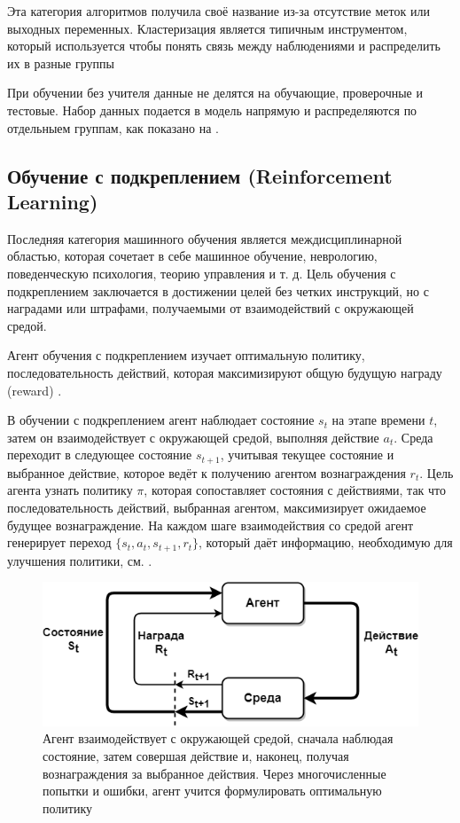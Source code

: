 Эта категория алгоритмов получила своё название из-за отсутствие меток или выходных переменных. Кластеризация является типичным инструментом, который используется чтобы понять связь между наблюдениями и распределить их в разные группы \cite{hastie2001elements}

При обучении без учителя данные не делятся на обучающие, проверочные и тестовые. Набор данных подается в модель напрямую и распределяются по отдельныем группам, как показано на .


\subsection{Обучение с подкреплением (Reinforcement Learning)}

Последняя категория машинного обучения является междисциплинарной областью, которая сочетает в себе машинное обучение, неврологию, поведенческую психология, теорию управления и т. д. Цель обучения с подкреплением заключается в достижении целей без четких инструкций, но с наградами или штрафами, получаемыми от взаимодействий с окружающей средой. 

Агент обучения с подкреплением изучает оптимальную политику, последовательность действий, которая максимизируют общую будущую награду (reward) \cite{SuttonAndBarto-RL-Introduction-p2}.

В обучении с подкреплением агент наблюдает состояние ${s_t}$ на этапе времени ${t}$, затем он взаимодействует с окружающей средой, выполняя действие ${a_t}$. Среда переходит в следующее состояние ${s_{t+1}}$, учитывая текущее состояние и выбранное действие, которое ведёт к получению агентом вознаграждения ${r_t}$. Цель агента узнать политику $\pi$, которая сопоставляет состояния с действиями, так что последовательность действий, выбранная агентом, максимизирует ожидаемое будущее вознаграждение. На каждом шаге взаимодействия со средой агент генерирует переход ${\{s_t, a_t, s_{t+1}, r_t\}}$, который даёт информацию, необходимую для улучшения политики, см. .

\begin{figure}[ht!] 
	\center
	\includegraphics [scale=0.60] {my_folder/images/ch1/rl-flow.png}
	\caption{Агент взаимодействует с окружающей средой, сначала наблюдая состояние, затем совершая действие и, наконец, получая вознаграждения за выбранное действия. Через многочисленные попытки и ошибки, агент учится формулировать оптимальную политику \cite{SuttonAndBarto-RL-Introduction-p50}} 
	\label{fig:ch1-RL-flow}
\end{figure}
